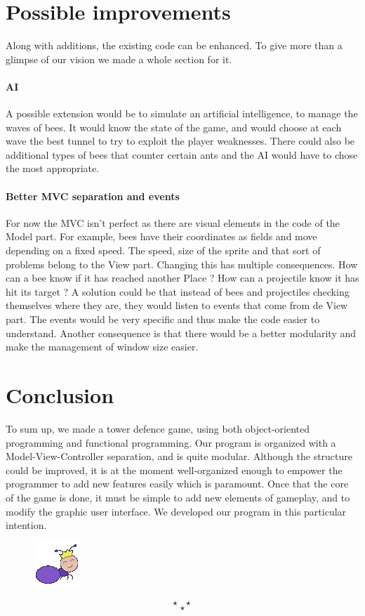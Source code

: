 \documentclass[
	a4paper
]{article}
\newcommand{\theEnd}{\[\star ~ ~ ~ \star\]\[\star\]}
\begin{document}
\section{Possible improvements} %

Along with additions, the existing code can be enhanced. %
To give more than a glimpse of our vision we made a whole section for it.


\paragraph{AI} A possible extension would be to simulate an artificial intelligence, to manage the waves of bees. %
It would know the state of the game, and would choose at each wave the best tunnel to try to exploit the player weaknesses. %
There could also be additional types of bees that counter certain ants and the AI would have to chose the most appropriate.

\paragraph{Better MVC separation and events} For now the MVC isn't perfect as there are visual elements in the code of the Model part. %
For example, bees have their coordinates as fields and move depending on a fixed speed. %
The speed, size of the sprite and that sort of problems belong to the View part. %
Changing this has multiple consequences. How can a bee know if it has reached another Place ? %
How can a projectile know it has hit its target ? %
A solution could be that instead of bees and projectiles checking themselves where they are, they would listen to events that come from de View part. %
The events would be very specific and thus make the code easier to understand. %
Another consequence is that there would be a better modularity and make the management of window size easier.


\section*{Conclusion} %

To sum up, we made a tower defence game, using both object-oriented programming and functional programming. %
Our program is organized with a Model-View-Controller separation, and is quite modular. %
Although the structure could be improved, it is at the moment well-organized enough to empower the programmer to add new features easily which is paramount. %
Once that the core of the game is done, it must be simple to add new elements of gameplay, and to modify the graphic user interface. %
We developed our program in this particular intention.


%
\begin{figure}[H]
	\includegraphics[scale=0.5]{ant_queen.png}
\end{figure}
%

\theEnd
\end{document}
